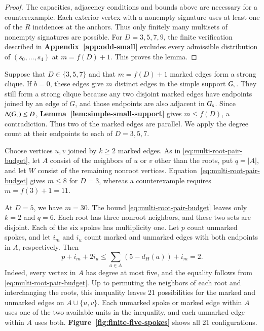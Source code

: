 \documentclass[preprint,11pt,numbers]{elsarticle-arxiv}
\numberwithin{equation}{section}
\theoremstyle{definition}
\begin{document}
\begin{proof}
The capacities, adjacency conditions and bounds above are necessary
for a counterexample. Each exterior vertex with a nonempty signature
uses at least one of the $R$ incidences at the anchors. Thus only
finitely many multisets of nonempty signatures are possible. For
$D=3,5,7,9$, the finite verification described
in \textbf{Appendix~\ref{app:odd-small}} excludes every admissible distribution
of $(s_0,\ldots,s_4)$ at $m=f(D)+1$. This proves the lemma.
\end{proof}

Suppose that $D\in\{3,5,7\}$ and that $m=f(D)+1$ marked edges form
a strong clique. If $b=0$, these edges give $m$ distinct edges in
the simple support $G_{\rm s}$. They still form a strong clique
because any two disjoint marked edges have endpoints joined by an
edge of $G$, and those endpoints are also adjacent in $G_{\rm s}$. Since
$\Delta(G_{\rm s})\leq D$, \textbf{Lemma~\ref{lem:simple-small-support}}
gives $m\leq f(D)$, a contradiction. Thus two of the marked edges
are parallel. We apply the degree count at their endpoints to each of
$D=3,5,7$.

Choose vertices $u,v$ joined by $k\geq2$ marked edges. As in
\eqref{eq:multi-root-pair-budget}, let $A$ consist of the neighbors of
$u$ or $v$ other than the roots, put $q=|A|$, and let $W$ consist of
the remaining nonroot vertices. Equation~\eqref{eq:multi-root-pair-budget} gives
$m\leq8$ for $D=3$, whereas a counterexample requires $m=f(3)+1=11$.

At $D=5$, we have $m=30$. The bound
\eqref{eq:multi-root-pair-budget} leaves only $k=2$ and $q=6$.
Each root has three nonroot neighbors, and these two sets are
disjoint. Each of the six spokes has multiplicity one. Let $p$
count unmarked spokes, and let $i_m$ and $i_u$ count marked and
unmarked edges with both endpoints in $A$, respectively. Then
\[
 p+i_m+2i_u\le\sum_{a\in A}(5-d_H(a))+i_m=2.
\]
Indeed, every vertex in $A$ has degree at most five, and
the equality follows from \eqref{eq:multi-root-pair-budget}.
Up to permuting the neighbors of each root and interchanging the
roots, this inequality leaves 21 possibilities for the marked and
unmarked edges on $A\cup\{u,v\}$. Each unmarked spoke or marked edge
within $A$ uses one of the two available units in the inequality,
and each unmarked edge within $A$ uses both.
\textbf{Figure~\ref{fig:finite-five-spokes}} shows all 21 configurations.
\end{document}
